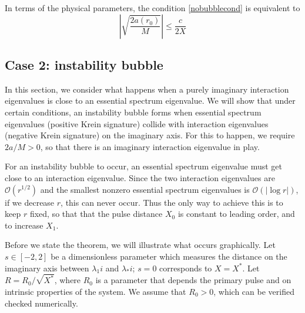 \documentclass[thesis.tex]{subfiles}
\begin{document}
\begin{remark}
In terms of the physical parameters, the condition \cref{nobubblecond} is equivalent to  
\[
\left| \sqrt{\frac{2a(r_0)}{M}} \right| \leq \frac{c}{2 X}
\]
\end{remark}

\subsection{Case 2: instability bubble}\label{section:2perbubble}

In this section, we consider what happens when a purely imaginary interaction eigenvalues is close to an essential spectrum eigenvalue. We will show that under certain conditions, an instability bubble forms when essential spectrum eigenvalues (positive Krein signature) collide with interaction eigenvalues (negative Krein signature) on the imaginary axis. For this to happen, we require $2a/M > 0$, so that there is an imaginary interaction eigenvalue in play.

For an instability bubble to occur, an essential spectrum eigenvalue must get close to an interaction eigenvalue. Since the two interaction eigenvalues are $\mathcal{O}(r^{1/2})$ and the smallest nonzero essential spectrum eigenvalues is $\mathcal{O}(|\log r|)$, if we decrease $r$, this can never occur. Thus the only way to achieve this is to keep $r$ fixed, so that that the pulse distance $X_0$ is constant to leading order, and to increase $X_1$.

Before we state the theorem, we will illustrate what occurs graphically. Let $s \in [-2, 2]$ be a dimensionless parameter which measures the distance on the imaginary axis between $\lambda_1 i$ and $\lambda_* i$; $s = 0$ corresponds to $X = X^*$. Let $R = R_0 / \sqrt{X^*}$, where $R_0$ is a parameter that depends the primary pulse and on intrinsic properties of the system. We assume that $R_0 > 0$, which can be verified checked numerically.
\end{document}
